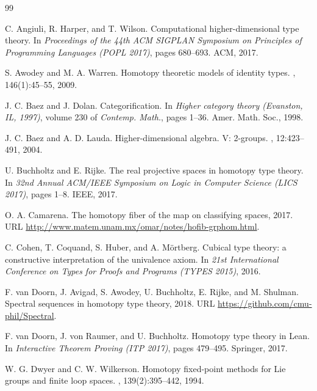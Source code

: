 \documentclass[12pt]{article}
\begin{document}
\begin{thebibliography}{99}

C. Angiuli, R. Harper, and T. Wilson.
\newblock Computational higher-dimensional type theory.
\newblock In {\em Proceedings of the 44th ACM SIGPLAN Symposium on Principles of Programming Languages (POPL 2017)}, pages 680--693. ACM, 2017.

S. Awodey and M. A. Warren.
\newblock Homotopy theoretic models of identity types.
, 146(1):45--55, 2009.

J. C. Baez and J. Dolan.
\newblock Categorification.
\newblock In {\em Higher category theory (Evanston, IL, 1997)}, volume 230 of {\em Contemp. Math.}, pages 1--36. Amer. Math. Soc., 1998.

J. C. Baez and A. D. Lauda.
\newblock Higher-dimensional algebra. V: 2-groups.
, 12:423--491, 2004.

U. Buchholtz and E. Rijke.
\newblock The real projective spaces in homotopy type theory.
\newblock In {\em 32nd Annual ACM/IEEE Symposium on Logic in Computer Science (LICS 2017)}, pages 1--8. IEEE, 2017.

O. A. Camarena.
\newblock The homotopy fiber of the map on classifying spaces, 2017.
\newblock URL \url{http://www.matem.unam.mx/omar/notes/hofib-grphom.html}.

C. Cohen, T. Coquand, S. Huber, and A. Mörtberg.
\newblock Cubical type theory: a constructive interpretation of the univalence axiom.
\newblock In {\em 21st International Conference on Types for Proofs and Programs (TYPES 2015)}, 2016.

F. van Doorn, J. Avigad, S. Awodey, U. Buchholtz, E. Rijke, and M. Shulman.
\newblock Spectral sequences in homotopy type theory, 2018.
\newblock URL \url{https://github.com/cmu-phil/Spectral}.

F. van Doorn, J. von Raumer, and U. Buchholtz.
\newblock Homotopy type theory in {Lean}.
\newblock In {\em Interactive Theorem Proving (ITP 2017)}, pages 479--495. Springer, 2017.

W. G. Dwyer and C. W. Wilkerson.
\newblock Homotopy fixed-point methods for {Lie} groups and finite loop spaces.
, 139(2):395--442, 1994.


\end{thebibliography}
\end{document}
